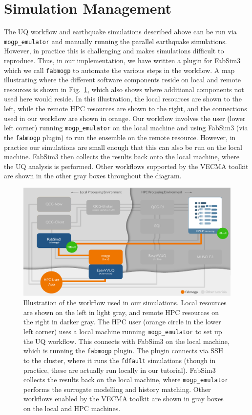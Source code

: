 \documentclass[openacc]{rstransa}%
\begin{document}
\section{Simulation Management}

The UQ workflow and earthquake simulations described above can be run via \texttt{mogp\_emulator} and
manually running the parallel earthquake simulations. However, in practice this is challenging
and makes simulations difficult to reproduce. Thus, in our implementation, we have written a plugin
for FabSim3 which we call \texttt{fabmogp} to automate the various steps in the workflow. A map illustrating
where the different software components reside on local and remote resources is shown in
Fig.~\ref{tubemap}, which also shows where additional components not used here would reside.
In this illustration, the local resources are shown to the left, while the remote HPC
resources are shown to the right, and the connections used in our workflow are shown in orange.
Our workflow involves the user (lower left corner) running \texttt{mogp\_emulator} on
the local machine and using FabSim3 (via the \texttt{fabmogp} plugin) to run the ensemble
on the remote resource. However, in practice our simulations are small enough that this can also
be run on the local machine. FabSim3 then collects the results back onto the local machine,
where the UQ analysis is performed. Other workflows supported by the VECMA toolkit are shown
in the other gray boxes throughout the diagram.

\begin{figure}[!h]
\centering\includegraphics[width=5in]{vecmatk-tubemap-mogp.pdf}
\caption{Illustration of the workflow used in our simulations. Local resources are shown on the
left in light gray, and remote HPC resources on the right in darker gray. The HPC user (orange circle in
the lower left corner) uses a local machine running \texttt{mogp\_emulator} to set up the
UQ workflow. This connects with FabSim3 on the local machine, which is running the
\texttt{fabmogp} plugin. The plugin
connects via SSH to the cluster, where it runs the \texttt{fdfault} simulations (though
in practice, these are actually run locally in our tutorial). FabSim3 collects the results
back on the local machine, where \texttt{mogp\_emulator} performs the surrogate modelling
and history matching.
Other workflows enabled by the VECMA toolkit are shown in gray boxes on the local and HPC machines.}
\label{tubemap}
\end{figure}
\end{document}
